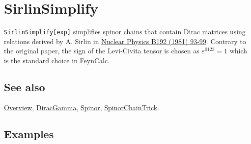 \documentclass[../FeynCalcManual.tex]{subfiles}
\begin{document}
\hypertarget{sirlinsimplify}{
\section{SirlinSimplify}\label{sirlinsimplify}}

\texttt{SirlinSimplify[\allowbreak{}exp]} simplifies spinor chains that
contain Dirac matrices using relations derived by A. Sirlin in
\href{https://doi.org/10.1016/0550-3213(81)90195-4}{Nuclear Physics B192
(1981) 93-99}. Contrary to the original paper, the sign of the
Levi-Civita tensor is chosen as \(\varepsilon^{0123}=1\) which is the
standard choice in FeynCalc.

\subsection{See also}

\hyperlink{toc}{Overview}, \hyperlink{diracgamma}{DiracGamma},
\hyperlink{spinor}{Spinor},
\hyperlink{spinorchaintrick}{SpinorChainTrick}.

\subsection{Examples}

\begin{Shaded}
\begin{Highlighting}[]
\OperatorTok{[}\OperatorTok{,}\OperatorTok{]}\OperatorTok{[}\SpecialCharTok{\textbackslash{}}\OperatorTok{[}\OperatorTok{],} \SpecialCharTok{\textbackslash{}}\OperatorTok{[}\OperatorTok{],} \SpecialCharTok{\textbackslash{}}\OperatorTok{[}\OperatorTok{],} \OperatorTok{]}\OperatorTok{[}\OperatorTok{,}\OperatorTok{]}\OperatorTok{[}\OperatorTok{,}\OperatorTok{]}\OperatorTok{[}\SpecialCharTok{\textbackslash{}}\OperatorTok{[}\OperatorTok{],} \SpecialCharTok{\textbackslash{}}\OperatorTok{[}\OperatorTok{],} \SpecialCharTok{\textbackslash{}}\OperatorTok{[}\OperatorTok{],} \OperatorTok{]}\OperatorTok{[}\OperatorTok{,}\OperatorTok{]} 
 
\OperatorTok{[}\SpecialCharTok{\%}\OperatorTok{]}
\end{Highlighting}
\end{Shaded}
\end{document}
